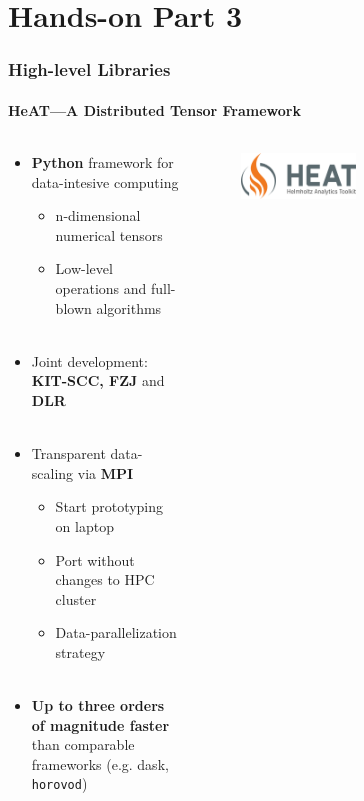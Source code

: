 \documentclass[aspectratio=1610]{beamer}
\begin{document}
\section{Hands-on Part 3}

\begin{frame}
    \frametitle{High-level Libraries}
    \framesubtitle{HeAT---A Distributed Tensor Framework}
    
    \begin{columns}
        \begin{column}{0.58\textwidth}
            \begin{itemize}
                \item \textbf{Python} framework for data-intesive computing
                \begin{itemize}
                    \item n-dimensional numerical tensors
                    \item Low-level operations and full-blown algorithms\\~
                \end{itemize}
                \item Joint development: \textbf{KIT-SCC, FZJ} and \textbf{DLR}\\~
                \item Transparent data-scaling via \textbf{MPI}
                \begin{itemize}
                    \item Start prototyping on laptop
                    \item Port without changes to HPC cluster
                    \item Data-parallelization strategy\\~
                \end{itemize}
                \item \textbf{Up to three orders of magnitude faster} than comparable frameworks (e.g. dask, \texttt{horovod})
            \end{itemize}
        \end{column}
        \begin{column}{0.38\textwidth}
            \begin{figure}
                \centering
                \includegraphics[width=0.5\textwidth]{images/logo-heat.pdf}

\end{figure}
\end{column}
\end{columns}
\end{frame}
\end{document}
